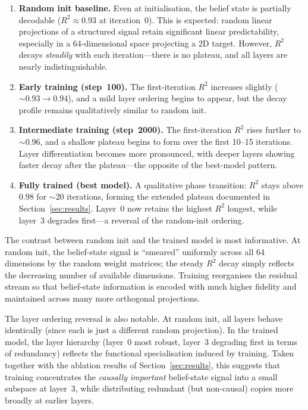 \documentclass[11pt]{article}
\begin{document}
\begin{enumerate}
  \item \textbf{Random init baseline.}  Even at initialisation, the belief state is partially decodable ($R^2 \approx 0.93$ at iteration~0).  This is expected: random linear projections of a structured signal retain significant linear predictability, especially in a 64-dimensional space projecting a 2D target.  However, $R^2$ decays \emph{steadily} with each iteration---there is no plateau, and all layers are nearly indistinguishable.

  \item \textbf{Early training (step~100).}  The first-iteration $R^2$ increases slightly (${\sim}0.93 \to 0.94$), and a mild layer ordering begins to appear, but the decay profile remains qualitatively similar to random init.

  \item \textbf{Intermediate training (step~2000).}  The first-iteration $R^2$ rises further to ${\sim}0.96$, and a shallow plateau begins to form over the first 10--15 iterations.  Layer differentiation becomes more pronounced, with deeper layers showing faster decay after the plateau---the opposite of the best-model pattern.

  \item \textbf{Fully trained (best model).}  A qualitative phase transition: $R^2$ stays above 0.98 for ${\sim}20$ iterations, forming the extended plateau documented in Section~\ref{sec:results}.  Layer~0 now retains the highest $R^2$ longest, while layer~3 degrades first---a reversal of the random-init ordering.
\end{enumerate}

The contrast between random init and the trained model is most informative.  At random init, the belief-state signal is ``smeared'' uniformly across all 64 dimensions by the random weight matrices; the steady $R^2$ decay simply reflects the decreasing number of available dimensions.  Training reorganises the residual stream so that belief-state information is encoded with much higher fidelity and maintained across many more orthogonal projections.

The layer ordering reversal is also notable.  At random init, all layers behave identically (since each is just a different random projection).  In the trained model, the layer hierarchy (layer~0 most robust, layer~3 degrading first in terms of redundancy) reflects the functional specialisation induced by training.  Taken together with the ablation results of Section~\ref{sec:results}, this suggests that training concentrates the \emph{causally important} belief-state signal into a small subspace at layer~3, while distributing redundant (but non-causal) copies more broadly at earlier layers.
\end{document}
